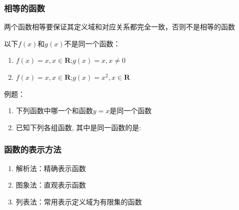 \subsubsection*{相等的函数}
两个函数相等要保证其定义域和对应关系都完全一致，否则不是相等的函数
\begin{example}
    以下$f(x)$和$g(x)$不是同一个函数：
    \begin{enumerate}
        \item $f(x) = x, x \in \mathbf{R}$;\quad $g(x) = x, x \neq 0$
        \item $f(x) = x, x \in \mathbf{R}$;\quad $g(x) = x^2, x \in \mathbf{R}$
    \end{enumerate}
\end{example}
例题：
\begin{enumerate}
    \item 下列函数中哪一个和函数$y = x$是同一个函数 
    \item 已知下列各组函数, 其中是同一函数的是:
\end{enumerate}

\subsubsection*{函数的表示方法}
\begin{enumerate}
    \item 解析法：精确表示函数
    \item 图象法：直观表示函数
    \item 列表法：常用表示定义域为有限集的函数
\end{enumerate}

